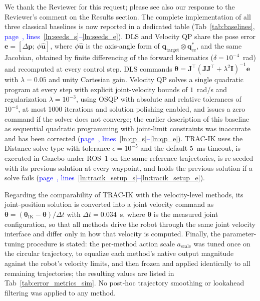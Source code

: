 \documentclass[11pt]{elsarticle}
\newcommand{\mlines}[2]{\textcolor{blue}{page~\pageref{#1}, lines~\ref{#1}--\ref{#2}}}
\begin{document}
\begin{responsebox}
We thank the Reviewer for this request; please see also our response to the Reviewer's comment on the Results section. The complete implementation of all three classical baselines is now reported in a dedicated table (Tab~\ref{tab:baselines}, \mlines{ln:seeds_s}{ln:seeds_e}). DLS and Velocity QP share the pose error $\mathbf{e}=[\Delta\mathbf{p};\,\phi\hat{\mathbf{u}}]$, where $\phi\hat{\mathbf{u}}$ is the axis-angle form of $\mathbf{q}_\text{target}\otimes\mathbf{q}_\text{ee}^{*}$, and the same Jacobian, obtained by finite differencing of the forward kinematics ($\delta=10^{-4}$~rad) and recomputed at every control step. DLS commands $\dot{\boldsymbol{\theta}}=\mathbf{J}^{\top}(\mathbf{J}\mathbf{J}^{\top}+\lambda^{2}\mathbf{I})^{-1}\mathbf{e}$ with $\lambda=0.05$ and unity Cartesian gain. Velocity QP solves a single quadratic program at every step with explicit joint-velocity bounds of $1$~rad/s and regularization $\lambda=10^{-3}$, using OSQP with absolute and relative tolerances of $10^{-4}$, at most 1000 iterations and solution polishing enabled, and issues a zero command if the solver does not converge; the earlier description of this baseline as sequential quadratic programming with joint-limit constraints was inaccurate and has been corrected (\mlines{ln:qp_s}{ln:qp_e}). TRAC-IK uses the Distance solve type with tolerance $\epsilon=10^{-5}$ and the default 5~ms timeout, is executed in Gazebo under ROS~1 on the same reference trajectories, is re-seeded with its previous solution at every waypoint, and holds the previous solution if a solve fails (\mlines{ln:tracik_setup_s}{ln:tracik_setup_e}).

Regarding the comparability of TRAC-IK with the velocity-level methods, its joint-position solution is converted into a joint velocity command as $\dot{\boldsymbol{\theta}}=(\boldsymbol{\theta}_\text{IK}-\boldsymbol{\theta})/\Delta t$ with $\Delta t=0.034$~s, where $\boldsymbol{\theta}$ is the measured joint configuration, so that all methods drive the robot through the same joint velocity interface and differ only in how that velocity is computed. Finally, the parameter-tuning procedure is stated: the per-method action scale $a_\text{scale}$ was tuned once on the circular trajectory, to equalize each method's native output magnitude against the robot's velocity limits, and then frozen and applied identically to all remaining trajectories; the resulting values are listed in Tab~\ref{tab:error_metrics_sim}. No post-hoc trajectory smoothing or lookahead filtering was applied to any method.
\end{responsebox}
\end{document}
